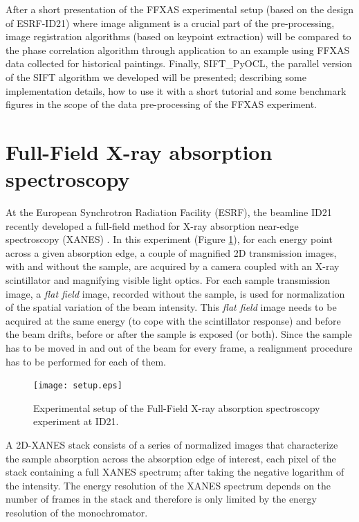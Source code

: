 \documentclass[preprint]{iucr}
\begin{document}
After a short presentation of the FFXAS
experimental setup (based on the design of ESRF-ID21) where image alignment is a
crucial part of the pre-processing, image registration algorithms (based on
keypoint extraction) will
be compared to the phase correlation algorithm through application to an example
using FFXAS data collected for historical paintings.
Finally, SIFT\_PyOCL, the parallel version of the SIFT algorithm we developed
will be presented; describing some implementation details, how to use it
with a short tutorial and some benchmark figures in the scope of the data
pre-processing of the FFXAS experiment.

\section{Full-Field X-ray absorption spectroscopy}
At the European Synchrotron Radiation Facility (ESRF), the beamline ID21
recently developed a full-field method for X-ray absorption near-edge
spectroscopy (XANES) \cite{andrade,fullfield}.
In this experiment (Figure \ref{setup}), for each energy point across a given
absorption edge, a couple of magnified 2D transmission images, with and
without the sample, are acquired by a camera coupled with an
X-ray scintillator and magnifying visible light optics.
For each sample transmission image, a \emph{flat field} image,
recorded without the sample, is used for normalization of the spatial
variation of the beam intensity.
This \emph{flat field} image needs to be acquired at the same energy (to cope
with the scintillator response) and before the beam drifts, before or
after the sample is exposed (or both).
Since the sample has to be moved in and out of the beam for every frame, a
realignment procedure has to be performed for each of them.

\begin{figure}
\label{setup}
\begin{center}
\texttt{[image: setup.eps]}
\caption{Experimental setup of the Full-Field X-ray absorption
spectroscopy experiment at ID21.}
\end{center}
\end{figure}

A 2D-XANES stack consists of a series of normalized images that
characterize the sample absorption across the absorption edge of interest, each pixel of the
stack containing a full XANES spectrum; after taking the negative logarithm
of the intensity.
The energy resolution of the XANES spectrum depends on the number of frames in
the stack and therefore is only limited by the energy resolution of the monochromator.
\end{document}
